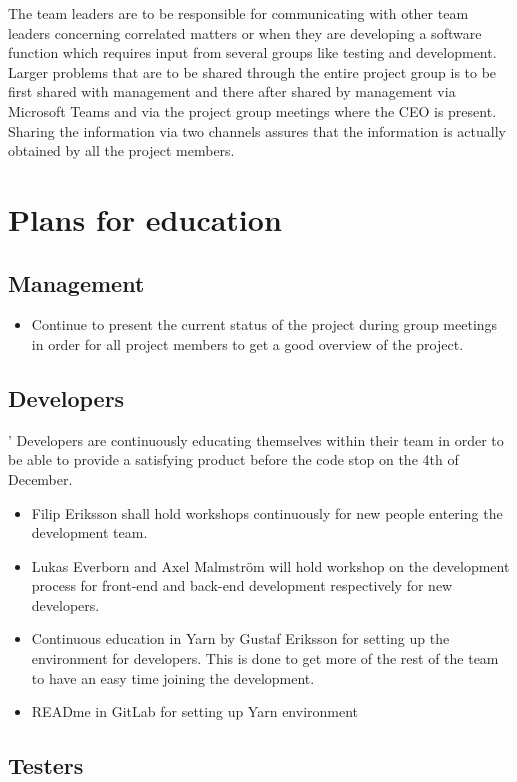 \documentclass[12pt]{article}
\begin{document}
The team leaders are to be responsible for communicating with other team leaders concerning correlated matters or when they are developing a software function which requires input from several groups like testing and development. Larger problems that are to be shared through the entire project group is to be first shared with management and there after shared by management via Microsoft Teams and via the project group meetings where the CEO is present. Sharing the information via two channels assures that the information is actually obtained by all the project members. 

\section{Plans for education}
\subsection{Management}
\begin{itemize}
    \item Continue to present the current status of the project during group meetings in order for all project members to get a good overview of the project.
\end{itemize}
 
\subsection{Developers}'
Developers are continuously educating themselves within their team in order to be able to provide a satisfying product before the code stop on the 4th of December. 
\begin{itemize}
    \item Filip Eriksson shall hold workshops continuously for new people entering the development team. 
    \item Lukas Everborn and Axel Malmström will hold workshop on the development process for front-end and back-end development respectively for new developers. 
    \item Continuous education in Yarn by Gustaf Eriksson for setting up the environment for developers. This is done to get more of the rest of the team to have an easy time joining the development. 
    \item READme in GitLab for setting up Yarn environment
\end{itemize}
\subsection{Testers}
\end{document}
